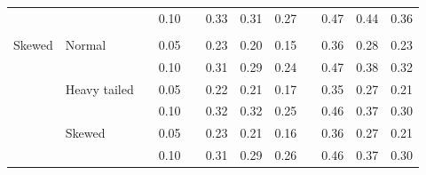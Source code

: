 \documentclass[12pt]{article} %
\begin{document}
\begin{table}[ht]
\begin{scriptsize}
\begin{center}
\begin{tabular}{ll p{.1cm} c p{.1cm} rrr p{.1cm} rrr}
             &              && 0.10 &&  0.33 & 0.31 & 0.27 && 0.47 & 0.44 & 0.36 \\ 
             &&&&&&&&&&&\\
Skewed       & Normal       && 0.05 &&  0.23 & 0.20 & 0.15 && 0.36 & 0.28 & 0.23 \\ 
             &              && 0.10 &&  0.31 & 0.29 & 0.24 && 0.47 & 0.38 & 0.32 \\ 
             & Heavy tailed && 0.05 &&  0.22 & 0.21 & 0.17 && 0.35 & 0.27 & 0.21 \\ 
             &              && 0.10 &&  0.32 & 0.32 & 0.25 && 0.46 & 0.37 & 0.30 \\ 
             & Skewed       && 0.05 &&  0.23 & 0.21 & 0.16 && 0.36 & 0.27 & 0.21 \\ 
             &              && 0.10 &&  0.31 & 0.29 & 0.26 && 0.46 & 0.37 & 0.30 \\
\hline
\end{tabular}
\end{center}
\end{scriptsize}
\end{table}
\end{document}

